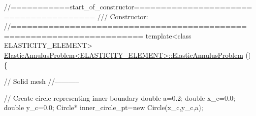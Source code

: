  
\begin{DoxyCodeInclude}
\textcolor{comment}{//===========start\_of\_constructor======================================= }
\textcolor{comment}{/// Constructor: }
\textcolor{comment}{}\textcolor{comment}{//====================================================================== }
\textcolor{keyword}{template}<\textcolor{keyword}{class} ELASTICITY\_ELEMENT>
\hyperlink{classElasticAnnulusProblem_aedf3d30576ccc20e2d8aa809cf075228}{ElasticAnnulusProblem<ELASTICITY\_ELEMENT>::ElasticAnnulusProblem}
      () 
\{
 
 \textcolor{comment}{// Solid mesh}
 \textcolor{comment}{//-----------}

 \textcolor{comment}{// Create circle representing inner boundary}
 \textcolor{keywordtype}{double} a=0.2;
 \textcolor{keywordtype}{double} x\_c=0.0;
 \textcolor{keywordtype}{double} y\_c=0.0;
 Circle* inner\_circle\_pt=\textcolor{keyword}{new} Circle(x\_c,y\_c,a);

\end{DoxyCodeInclude}


